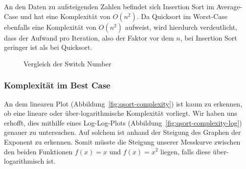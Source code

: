 An den Daten zu aufsteigenden Zahlen befindet sich Insertion Sort im
Average-Case und hat eine Komplexität von \(O(n^2)\).
Da Quicksort im Worst-Case ebenfalls eine Komplexität von \(O(n^2)\)
aufweist, wird hierdurch verdeutlicht, dass der Aufwand pro Iteration, also
der Faktor vor dem \(n\), bei Insertion Sort geringer ist als bei Quicksort.


\begin{figure}[hbt]
    \centering
    \caption{Vergleich der Switch Number}
\end{figure}

\subsubsection{Komplexität im Best Case}\label{subsubsec:qsort-best-case}

An dem linearen Plot (Abbildung~\ref{fig:qsort-complexity})
ist kaum zu erkennen, ob eine lineare oder
über-logarithmische Komplexität vorliegt.
Wir haben uns erhofft, dies mithilfe eines Log-Log-Plots
(Abbildung~\ref{fig:qsort-complexity-log}) genauer zu untersuchen.
Auf solchem ist anhand der Steigung des Graphen der Exponent zu erkennen.
Somit müsste die Steigung unserer Messkurve zwischen den beiden Funktionen
\(f(x)=x\) und \(f(x)=x^2\) liegen, falls diese über-logarithmisch ist.

